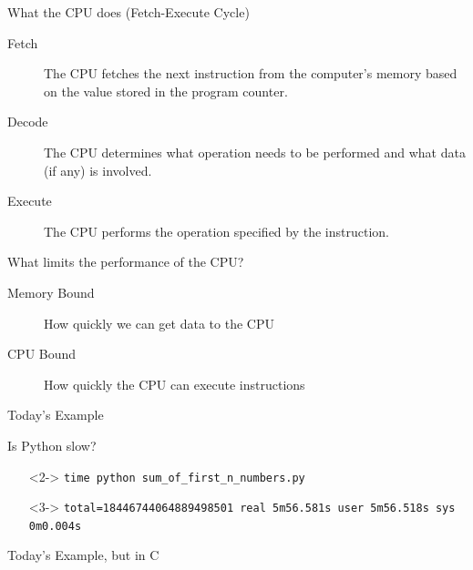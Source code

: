 \documentclass[12pt, aspectration=169]{beamer}
\begin{document}
    \begin{frame}{What the CPU does (Fetch-Execute Cycle)}
        \begin{description}
            \item[Fetch] The CPU fetches the next instruction from the computer's memory based on the value stored in the program counter.
            \item[Decode] The CPU determines what operation needs to be performed and what data (if any) is involved.
            \item[Execute] The CPU performs the operation specified by the instruction.
        \end{description}
    \end{frame}

    \begin{frame}{What limits the performance of the CPU?}
        \begin{description}
            \item[Memory Bound] How quickly we can get data to the CPU
            \item[CPU Bound] How quickly the CPU can execute instructions
        \end{description}
    \end{frame}

    \begin{frame}{Today's Example}
        
    \end{frame}

    \begin{frame}{Is Python slow?}
        \begin{itemize}
            \item[]<2-> \texttt{time python sum\_of\_first\_n\_numbers.py\newline}
            \item[]<3-> \texttt{total=18446744064889498501\newline
            real 5m56.581s\newline
            user 5m56.518s\newline
            sys 0m0.004s\newline}
        \end{itemize}
    \end{frame}

    \begin{frame}{Today's Example, but in C}
        
    \end{frame}
\end{document}
